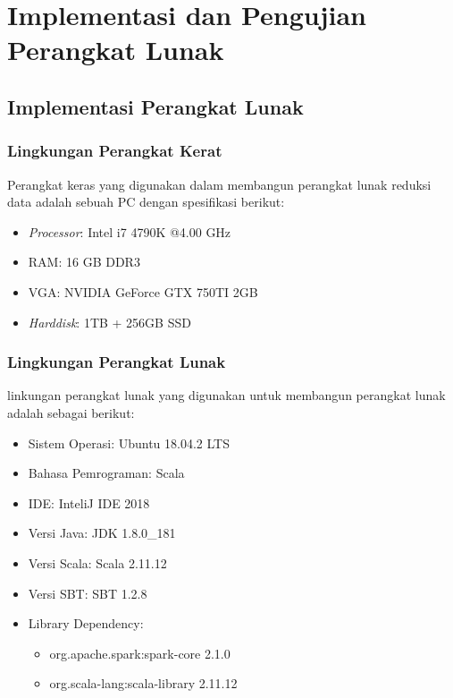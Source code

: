 \chapter{Implementasi dan Pengujian Perangkat Lunak}
\label{chap:Implementasi dan Pengujian Perangkat Lunak}

\section{Implementasi Perangkat Lunak}

\subsection{Lingkungan Perangkat Kerat}

Perangkat keras yang digunakan dalam membangun perangkat lunak reduksi data adalah sebuah PC dengan spesifikasi berikut:

\begin{itemize}
\item \textit{Processor}: Intel i7 4790K @4.00 GHz

\item RAM: 16 GB DDR3

\item VGA: NVIDIA GeForce GTX 750TI 2GB

\item \textit{Harddisk}: 1TB + 256GB SSD 

\end{itemize}

\subsection{Lingkungan Perangkat Lunak}

linkungan perangkat lunak yang digunakan untuk membangun perangkat lunak adalah sebagai berikut:

\begin{itemize}

\item Sistem Operasi: Ubuntu 18.04.2 LTS

\item Bahasa Pemrograman: Scala

\item IDE: InteliJ IDE 2018

\item Versi Java: JDK 1.8.0\_181

\item Versi Scala: Scala 2.11.12

\item Versi SBT: SBT 1.2.8

\item Library Dependency:

\begin{itemize}
\item org.apache.spark:spark-core 2.1.0

\item org.scala-lang:scala-library 2.11.12
\end{itemize}

\end{itemize}



